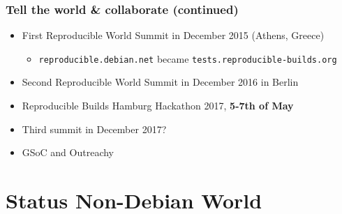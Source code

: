 \documentclass[14pt,aspectratio=169]{beamer}
\newif\ifplacelogo
\begin{document}
\begin{frame}
 \frametitle{Tell the world \& collaborate (continued)}

 \begin{itemize}
  \item First Reproducible World Summit in December 2015 (Athens, Greece)
   \begin{itemize}
    \item \texttt{reproducible.debian.net} became \texttt{tests.reproducible-builds.org}
   \end{itemize}
    \item Second Reproducible World Summit in December 2016 in Berlin
    \item Reproducible Builds Hamburg Hackathon 2017, \textbf{5-7th of May}
    \item Third summit in December 2017?
   \item<2> GSoC and Outreachy
 \end{itemize}
\end{frame}



\section{Status Non-Debian World}

\placelogofalse
\end{document}
